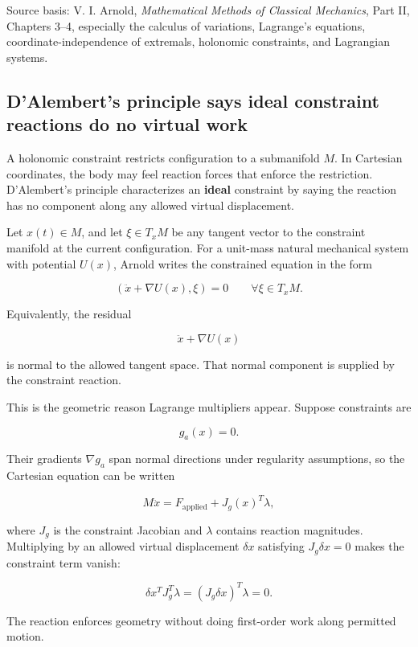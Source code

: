 Source basis: V. I. Arnold, \emph{Mathematical Methods of Classical Mechanics}, Part II, Chapters 3--4, especially the calculus of variations, Lagrange's equations, coordinate-independence of extremals, holonomic constraints, and Lagrangian systems.

\subsection{D'Alembert's principle says ideal constraint reactions do no virtual work}\label{02-foundations-ii-ch039-dalemberts-principle-says-ideal-constraint-reactions-do-no-virtual-work}

A holonomic constraint restricts configuration to a submanifold \(M\). In Cartesian coordinates, the body may feel reaction forces that enforce the restriction. D'Alembert's principle characterizes an \textbf{ideal} constraint by saying the reaction has no component along any allowed virtual displacement.

Let \(x(t)\in M\), and let \(\xi\in T_xM\) be any tangent vector to the constraint manifold at the current configuration. For a unit-mass natural mechanical system with potential \(U(x)\), Arnold writes the constrained equation in the form

\[
\left(
\ddot x+\nabla U(x),
\xi
\right)
=
0
\qquad
\forall \xi\in T_xM.
\]

Equivalently, the residual

\[
\ddot x+\nabla U(x)
\]

is normal to the allowed tangent space. That normal component is supplied by the constraint reaction.

This is the geometric reason Lagrange multipliers appear. Suppose constraints are

\[
g_a(x)=0.
\]

Their gradients \(\nabla g_a\) span normal directions under regularity assumptions, so the Cartesian equation can be written

\[
M\ddot x
=
F_{\mathrm{applied}}
+
J_g(x)^T\lambda,
\]

where \(J_g\) is the constraint Jacobian and \(\lambda\) contains reaction magnitudes. Multiplying by an allowed virtual displacement \(\delta x\) satisfying \(J_g\delta x=0\) makes the constraint term vanish:

\[
\delta x^T J_g^T\lambda
=
(J_g\delta x)^T\lambda
=
0.
\]

The reaction enforces geometry without doing first-order work along permitted motion.

